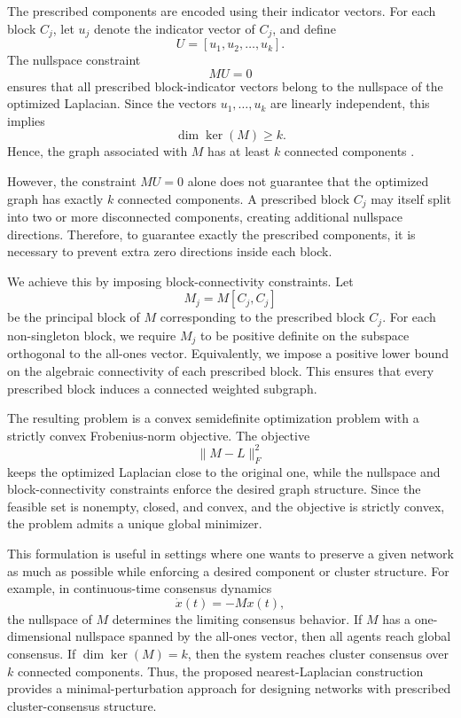 \documentclass[11pt]{article}
\begin{document}
	The prescribed components are encoded using their indicator vectors. For each block $C_j$, let $u_j$ denote the indicator vector of $C_j$, and define
	$$
	U=[u_1,u_2,\ldots,u_k].
	$$
	The nullspace constraint
	$$
	MU=0
	$$
	ensures that all prescribed block-indicator vectors belong to the nullspace of the optimized Laplacian. Since the vectors $u_1,\ldots,u_k$ are linearly independent, this implies
	$$
	\dim\ker(M)\ge k.
	$$
	Hence, the graph associated with $M$ has at least $k$ connected components \cite{Mohar1991}.
	
	However, the constraint $MU=0$ alone does not guarantee that the optimized graph has exactly $k$ connected components. A prescribed block $C_j$ may itself split into two or more disconnected components, creating additional nullspace directions. Therefore, to guarantee exactly the prescribed components, it is necessary to prevent extra zero directions inside each block.
	
	We achieve this by imposing block-connectivity constraints. Let
	$$
	M_j=M[C_j,C_j]
	$$
	be the principal block of $M$ corresponding to the prescribed block $C_j$. For each non-singleton block, we require $M_j$ to be positive definite on the subspace orthogonal to the all-ones vector. Equivalently, we impose a positive lower bound on the algebraic connectivity of each prescribed block. This ensures that every prescribed block induces a connected weighted subgraph.
	
	The resulting problem is a convex semidefinite optimization problem with a strictly convex Frobenius-norm objective. The objective
	$$
	\|M-L\|_F^2
	$$
	keeps the optimized Laplacian close to the original one, while the nullspace and block-connectivity constraints enforce the desired graph structure. Since the feasible set is nonempty, closed, and convex, and the objective is strictly convex, the problem admits a unique global minimizer.
	
	This formulation is useful in settings where one wants to preserve a given network as much as possible while enforcing a desired component or cluster structure. For example, in continuous-time consensus dynamics
	$$
	\dot{x}(t)=-Mx(t),
	$$
	the nullspace of $M$ determines the limiting consensus behavior. If $M$ has a one-dimensional nullspace spanned by the all-ones vector, then all agents reach global consensus. If $\dim\ker(M)=k$, then the system reaches cluster consensus over $k$ connected components. Thus, the proposed nearest-Laplacian construction provides a minimal-perturbation approach for designing networks with prescribed cluster-consensus structure.
   
\end{document}
